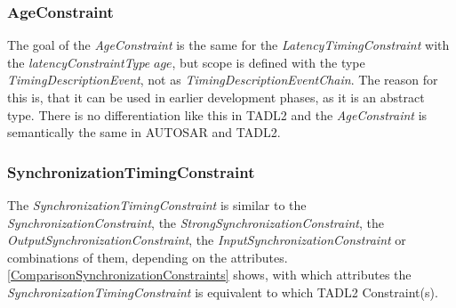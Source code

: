 	\subsubsection{AgeConstraint}
		The goal of the \emph{AgeConstraint} is the same for the \emph{LatencyTimingConstraint} with the \emph{latencyConstraintType} $age$, but scope is defined with the type \emph{TimingDescriptionEvent}, not as \emph{TimingDescriptionEventChain}. The reason for this is, that it can be used in earlier development phases, as it is an abstract type. There is no differentiation like this in TADL2 and the \emph{AgeConstraint} is semantically the same in AUTOSAR and TADL2.
		
	\subsubsection{SynchronizationTimingConstraint}
		The \emph{SynchronizationTimingConstraint} is similar to the \emph{SynchronizationConstraint}, the \emph{StrongSynchronizationConstraint}, the \emph{OutputSynchronizationConstraint}, the \emph{InputSynchronizationConstraint} or combinations of them, depending on the attributes. \ref{ComparisonSynchronizationConstraints} shows, with which attributes the \emph{SynchronizationTimingConstraint} is equivalent to which TADL2 Constraint(s).

